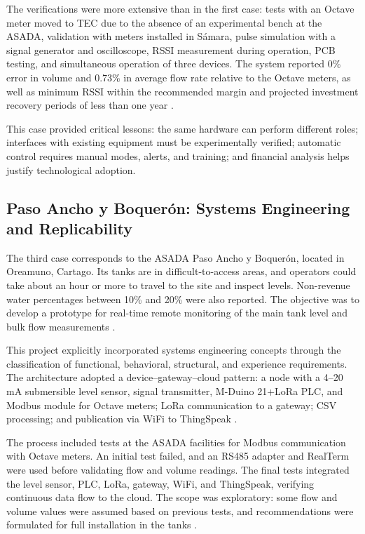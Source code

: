 \documentclass[conference]{IEEEtran}
\begin{document}
The verifications were more extensive than in the first case: tests with an Octave meter moved to TEC due to the absence of an experimental bench at the ASADA, validation with meters installed in Sámara, pulse simulation with a signal generator and oscilloscope, RSSI measurement during operation, PCB testing, and simultaneous operation of three devices. The system reported 0\% error in volume and 0.73\% in average flow rate relative to the Octave meters, as well as minimum RSSI within the recommended margin and projected investment recovery periods of less than one year \cite{Solorzano2021}.

This case provided critical lessons: the same hardware can perform different roles; interfaces with existing equipment must be experimentally verified; automatic control requires manual modes, alerts, and training; and financial analysis helps justify technological adoption.

\subsection{Paso Ancho y Boquerón: Systems Engineering and Replicability}
The third case corresponds to the ASADA Paso Ancho y Boquerón, located in Oreamuno, Cartago. Its tanks are in difficult-to-access areas, and operators could take about an hour or more to travel to the site and inspect levels. Non-revenue water percentages between 10\% and 20\% were also reported. The objective was to develop a prototype for real-time remote monitoring of the main tank level and bulk flow measurements \cite{Oviedo2024}.

This project explicitly incorporated systems engineering concepts through the classification of functional, behavioral, structural, and experience requirements. The architecture adopted a device--gateway--cloud pattern: a node with a 4--20 mA submersible level sensor, signal transmitter, M-Duino 21+LoRa PLC, and Modbus module for Octave meters; LoRa communication to a gateway; CSV processing; and publication via WiFi to ThingSpeak \cite{Oviedo2024}.

The process included tests at the ASADA facilities for Modbus communication with Octave meters. An initial test failed, and an RS485 adapter and RealTerm were used before validating flow and volume readings. The final tests integrated the level sensor, PLC, LoRa, gateway, WiFi, and ThingSpeak, verifying continuous data flow to the cloud. The scope was exploratory: some flow and volume values were assumed based on previous tests, and recommendations were formulated for full installation in the tanks \cite{Oviedo2024}.
\end{document}

